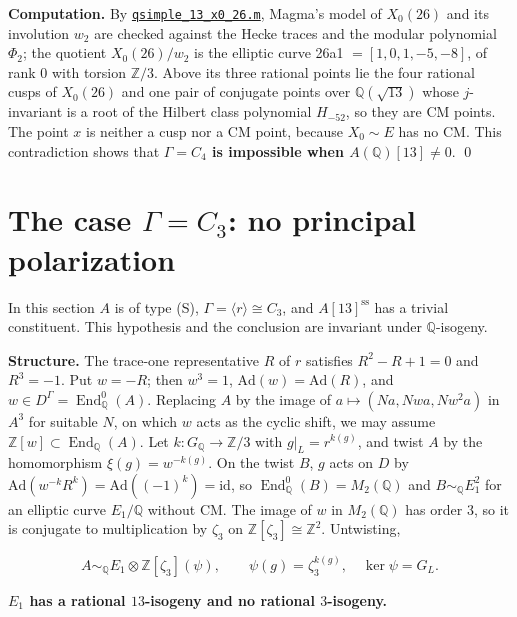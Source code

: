 \documentclass[11pt]{article}
\newcommand{\Q}{\mathbb Q}
\newcommand{\Z}{\mathbb Z}
\DeclareMathOperator{\End}{End}
\begin{document}
\textbf{Computation.} By \href{https://genus-2-torsion.github.io/data/knowledge/sources/qsimple_13_x0_26.m}{\texttt{qsimple\_\allowbreak{}13\_\allowbreak{}x0\_\allowbreak{}26.m}}, Magma's model of \(X_0(26)\) and its involution
      \(w_2\) are checked against the Hecke traces and the modular polynomial \(\Phi_2\); the quotient
      \(X_0(26)/w_2\) is the elliptic curve 26a1 \(=[1,0,1,-5,-8]\), of rank \(0\) with torsion \(\Z/3\). Above
      its three rational points lie the four rational cusps of \(X_0(26)\) and one pair of conjugate points
      over \(\Q(\sqrt{13})\) whose \(j\)-invariant is a root of the Hilbert class polynomial \(H_{-52}\), so they
      are CM points. The point \(x\) is neither a cusp nor a CM point, because \(X_0\sim E\) has no CM. This
      contradiction shows that \textbf{\(\Gamma=C_4\) is impossible when \(A(\Q)[13]\neq0\)}. \qed

\section{The case \(\Gamma=C_3\): no principal polarization}\label{c3}

In this section \(A\) is of type (S), \(\Gamma=\langle r\rangle\cong C_3\), and \(A[13]^{\mathrm{ss}}\) has a
      trivial constituent. This hypothesis and the conclusion are invariant under \(\Q\)-isogeny.

\textbf{Structure.} The trace-one representative \(R\) of \(r\) satisfies \(R^2-R+1=0\) and \(R^3=-1\).
      Put \(w=-R\); then \(w^3=1\), \(\mathrm{Ad}(w)=\mathrm{Ad}(R)\), and \(w\in D^\Gamma=\End^0_{\Q}(A)\).
      Replacing \(A\) by the image of \(a\mapsto(Na,Nwa,Nw^2a)\) in \(A^3\) for suitable \(N\), on which \(w\)
      acts as the cyclic shift, we may assume \(\Z[w]\subset\End_{\Q}(A)\). Let \(k:G_{\Q}\to\Z/3\) with
      \(g|_L=r^{k(g)}\), and twist \(A\) by the homomorphism \(\xi(g)=w^{-k(g)}\). On the twist \(B\), \(g\) acts on
      \(D\) by \(\mathrm{Ad}(w^{-k}R^k)=\mathrm{Ad}((-1)^k)=\mathrm{id}\), so \(\End^0_{\Q}(B)=M_2(\Q)\) and
      \(B\sim_{\Q}E_1^2\) for an elliptic curve \(E_1/\Q\) without CM. The image of \(w\) in \(M_2(\Q)\) has order
      \(3\), so it is conjugate to multiplication by \(\zeta_3\) on \(\Z[\zeta_3]\cong\Z^2\). Untwisting,

\[
A\sim_{\Q}E_1\otimes\Z[\zeta_3](\psi),\qquad \psi(g)=\zeta_3^{k(g)},\quad \ker\psi=G_L.
\]

\textbf{\(E_1\) has a rational \(13\)-isogeny and no rational \(3\)-isogeny.}
\end{document}
